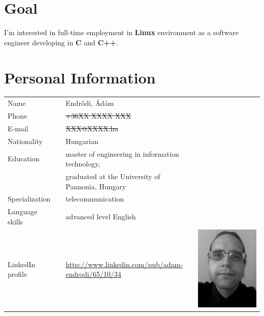 \documentclass[a4paper,12pt]{article}
\newcommand\Yell{\textbf}
\begin{document}
\section{Goal}

I'm interested in full-time employment in \Yell{Linux} environment
as a software engineer developing in \Yell{C} and \Yell{C++}.

\section{Personal Information}

\begin{tabularx}{\linewidth}{lXll}
Name			&& Endr\H{o}di, \'Ad\'am	&			\\
Phone			&& \sout{+36XX XXXX XXX}	&			\\
E-mail			&& \sout{XXX@XXXX.hu}		&			\\
Nationality		&& Hungarian			&			\\
Education		&& master of engineering in information technology, &	\\
			&& graduated at the University of Pannonia, Hungary &	\\
Specialization		&& telecommunication		&			\\
Language skills		&& advanced level English	&			\\
LinkedIn profile	&& \url{http://www.linkedin.com/pub/adam-endrodi/65/10/34}
			 & \includegraphics*[bb=0 0 72 1,clip=false]{me_2012}	\\
\end{tabularx}
\end{document}
